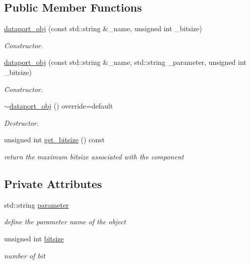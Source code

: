 \subsection*{Public Member Functions}
\begin{DoxyCompactItemize}
\item 
\hyperlink{classdataport__obj_ac6209f03a9516ff7f2c8f4ffa2cab16f}{dataport\+\_\+obj} (const std\+::string \&\+\_\+name, unsigned int \+\_\+bitsize)
\begin{DoxyCompactList}\small\item\em Constructor. \end{DoxyCompactList}\item 
\hyperlink{classdataport__obj_a609a5d2e03e127a315b939503c636c82}{dataport\+\_\+obj} (const std\+::string \&\+\_\+name, std\+::string \+\_\+parameter, unsigned int \+\_\+bitsize)
\begin{DoxyCompactList}\small\item\em Constructor. \end{DoxyCompactList}\item 
\hyperlink{classdataport__obj_ae77f5ac9cafd1d26f75e4c1c1b9c39db}{$\sim$dataport\+\_\+obj} () override=default
\begin{DoxyCompactList}\small\item\em Destructor. \end{DoxyCompactList}\item 
unsigned int \hyperlink{classdataport__obj_ae5c059193354235bc33d52f679e5bded}{get\+\_\+bitsize} () const
\begin{DoxyCompactList}\small\item\em return the maximum bitsize associated with the component \end{DoxyCompactList}\end{DoxyCompactItemize}
\subsection*{Private Attributes}
\begin{DoxyCompactItemize}
\item 
std\+::string \hyperlink{classdataport__obj_ae3a418c8affac21e96b6bd4a42f40e94}{parameter}
\begin{DoxyCompactList}\small\item\em define the parameter name of the object \end{DoxyCompactList}\item 
unsigned int \hyperlink{classdataport__obj_a005b5dfdb4876cc28467322baadebca8}{bitsize}
\begin{DoxyCompactList}\small\item\em number of bit \end{DoxyCompactList}\end{DoxyCompactItemize}
